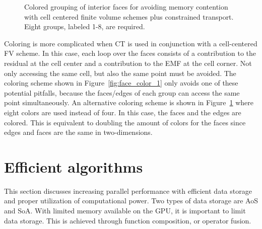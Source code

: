 \begin{figure}[htbp]\figSpace
\begin{center}

\end{center}
\caption{Colored grouping of interior faces for avoiding memory contention with cell centered finite volume schemes plus constrained transport.  Eight groups, labeled 1-8, are required.}
\label{fig:face_color_2}
\figSpace
\end{figure}

Coloring is more complicated when CT is used in conjunction with a cell-centered FV scheme.  In this case, each loop over the faces consists of a contribution to the residual at the cell center and a contribution to the EMF at the cell corner.  Not only accessing the same cell, but also the same point must be avoided.  The coloring scheme shown in Figure~\ref{fig:face_color_1} only avoids one of these potential pitfalls, because the faces/edges of each group can access the same point simultaneously.  An alternative coloring scheme is shown in Figure~\ref{fig:face_color_2} where eight colors are used instead of four.  In this case, the faces and the edges are colored.  This is equivalent to doubling the amount of colors for the faces since edges and faces are the same in two-dimensions.

\section[Efficient algorithms]{Efficient algorithms}
\label{sec:efficient_algo}

This section discusses increasing parallel performance with efficient data storage and proper utilization of computational power.  Two types of data storage are AoS and SoA.  With limited memory available on the GPU, it is important to limit data storage.  This is achieved through function composition, or operator fusion.

